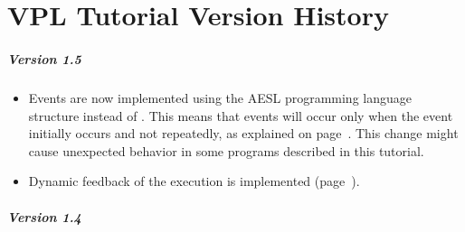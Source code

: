 
\chapter*{VPL Tutorial Version History}

\paragraph{Version 1.5}

\begin{itemize}

\item Events are now implemented using the AESL programming language structure  instead of . This means that events will occur only when the event initially occurs and not repeatedly, as explained on page~\pageref{p.if-when}. This change might cause unexpected behavior in some programs described in this tutorial.

\item Dynamic feedback of the execution is implemented (page~\pageref{p.feedback}).

\end{itemize}

\paragraph{Version 1.4}

